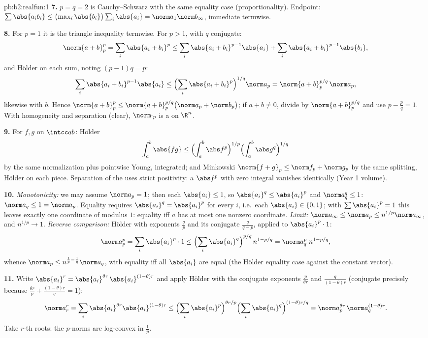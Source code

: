 \begin{solution}{pb:b2:realfun:1}
\textbf{7.} $p = q = 2$ is Cauchy--Schwarz with the same
equality case (proportionality). Endpoint: $\sum\abs{a_ib_i}
\leq \bigl(\max_i\abs{b_i}\bigr)\sum_i\abs{a_i} =
\norm a_1\norm b_\infty$, immediate termwise.

\textbf{8.} For $p = 1$ it is the triangle inequality termwise.
For $p > 1$, with $q$ conjugate:
\[
\norm{a+b}_p^p = \sum_i\abs{a_i + b_i}^p
\leq \sum_i\abs{a_i+b_i}^{p-1}\abs{a_i} +
\sum_i\abs{a_i+b_i}^{p-1}\abs{b_i},
\]
and H\"older on each sum, noting $(p - 1)q = p$:
\[
\sum_i\abs{a_i+b_i}^{p-1}\abs{a_i} \leq
\Bigl(\sum_i\abs{a_i+b_i}^{p}\Bigr)^{1/q}\norm a_p
= \norm{a + b}_p^{p/q}\,\norm a_p ,
\]
likewise with $b$. Hence $\norm{a+b}_p^p \leq \norm{a +
b}_p^{p/q}\bigl(\norm a_p + \norm b_p\bigr)$; if $a + b \neq 0$,
divide by $\norm{a+b}_p^{p/q}$ and use $p - \frac pq = 1$. With
homogeneity and separation (clear), $\norm\cdot_p$ is a  on
$\R^n$.

\textbf{9.} For  $f, g$ on $\intcc ab$: H\"older
\[
\int_a^b\abs{fg} \leq \Bigl(\int_a^b\abs
f^p\Bigr)^{1/p}\Bigl(\int_a^b\abs g^q\Bigr)^{1/q}
\]
by the same normalization plus pointwise Young, integrated; and
Minkowski $\norm{f + g}_p \leq \norm f_p + \norm g_p$ by the
same splitting, H\"older on each piece. Separation of the 
uses strict positivity: a  $\abs f^p$ with zero
integral vanishes identically (Year 1 volume).

\textbf{10.} \emph{Monotonicity:} we may assume $\norm a_p = 1$;
then each $\abs{a_i} \leq 1$, so $\abs{a_i}^q \leq \abs{a_i}^p$
and $\norm a_q^q \leq 1$: $\norm a_q \leq 1 = \norm a_p$.
Equality requires $\abs{a_i}^q = \abs{a_i}^p$ for every $i$,
i.e.\ each $\abs{a_i} \in \{0, 1\}$; with $\sum\abs{a_i}^p = 1$
this leaves exactly one coordinate of modulus $1$: equality iff
$a$ has at most one nonzero coordinate. \emph{Limit:} $\norm a_\infty \leq
\norm a_p \leq n^{1/p}\norm a_\infty$, and $n^{1/p} \to 1$.
\emph{Reverse comparison:} H\"older with exponents $\frac
qp$ and its conjugate $\frac{q}{q-p}$, applied to
$\abs{a_i}^p\cdot 1$:
\[
\norm a_p^p = \sum_i\abs{a_i}^p\cdot 1 \leq
\Bigl(\sum_i\abs{a_i}^{q}\Bigr)^{p/q}\,n^{1 - p/q}
= \norm a_q^{p}\; n^{1-p/q},
\]
whence $\norm a_p \leq n^{\frac1p - \frac1q}\norm a_q$, with
equality iff all $\abs{a_i}$ are equal (the H\"older equality
case against the constant vector).

\textbf{11.} Write $\abs{a_i}^r = \abs{a_i}^{\theta
r}\,\abs{a_i}^{(1-\theta)r}$ and apply H\"older with the
conjugate exponents $\frac{p}{\theta r}$ and
$\frac{q}{(1-\theta)r}$ (conjugate precisely because $\frac{\theta
r}p + \frac{(1-\theta)r}q = 1$):
\[
\norm a_r^r = \sum_i \abs{a_i}^{\theta r}\abs{a_i}^{(1-\theta)r}
\leq \Bigl(\sum_i\abs{a_i}^{p}\Bigr)^{\theta r/p}
\Bigl(\sum_i\abs{a_i}^{q}\Bigr)^{(1-\theta)r/q}
= \norm a_p^{\theta r}\,\norm a_q^{(1-\theta)r} .
\]
Take $r$-th roots: the $p$-norms are log-convex in $\frac1p$.


\end{solution}
